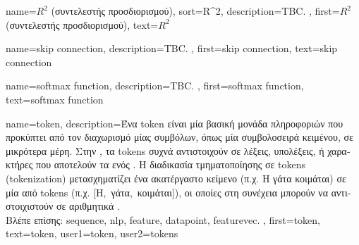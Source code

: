 {name={$R^2$ (\foreignlanguage{greek}{συντελεστής προσδιορισμού})}, 
sort={R^2},
	description={TBC. }, 
	first={$R^2$ (\foreignlanguage{greek}{συντελεστής προσδιορισμού})}, 
	text={$R^2$}
}

{name={skip connection},
	description={TBC. },
 	first={skip connection},
 	text={skip connection}
}

{name={softmax function},
	description={TBC. },
	first={softmax function},
	text={softmax function}
}

{name={token},
	description={\foreignlanguage{greek}{Ένα} token 
		\foreignlanguage{greek}{είναι μία βασική μονάδα πληροφοριών που προκύπτει από τον διαχωρισμό μίας}
  		 \foreignlanguage{greek}{συμβόλων, όπως μία συμβολοσειρά κειμένου, σε μικρότερα 
		μέρη. Στην} , \foreignlanguage{greek}{τα} tokens \foreignlanguage{greek}{συχνά αντιστοιχούν σε λέξεις, 
		υπολέξεις, ή χαρακτήρες που αποτελούν τα}  \foreignlanguage{greek}{ενός} . 
  		\foreignlanguage{greek}{Η διαδικασία τμηματοποίησης σε} tokens (tokenization) 
		\foreignlanguage{greek}{μετασχηματίζει ένα ακατέργαστο κείμενο (π.χ. \guillemotleft Η γάτα κοιμάται\guillemotright) σε μία} 
  		 \foreignlanguage{greek}{από} tokens \foreignlanguage{greek}{(π.χ. 
		[\guillemotleft Η\guillemotright,\ \guillemotleft γάτα\guillemotright,\ \guillemotleft κοιμάται\guillemotright]), 
		οι οποίες στη συνέχεια μπορούν να αντιστοιχιστούν σε αριθμητικά} .
		\\ 
		\foreignlanguage{greek}{Βλέπε επίσης:} \gls{sequence}, \gls{nlp}, \gls{feature}, \gls{datapoint}, \gls{featurevec}. }, 
  	first={token},
  	text={token},
	user1={token}, %
	user2={tokens} %
}%